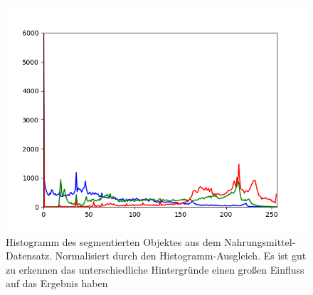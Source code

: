 \begin{appendices}
\begin{figure}[htb]
\begin{minipage}[c]{0.08\textwidth}
\end{minipage}
\hfill
\begin{minipage}[c]{0.3\textwidth}
\includegraphics[width=\textwidth]{Sources/Bild3_HA_histo.png}
\end{minipage}
\caption{Histogramm des segmentierten Objektes aus dem Nahrungsmittel-Datensatz. Normalisiert durch den Histogramm-Ausgleich. Es ist gut zu erkennen das unterschiedliche Hintergründe einen großen Einfluss auf das Ergebnis haben}
\label{img:evalHA}
\end{figure}
\newpage

\end{appendices}
